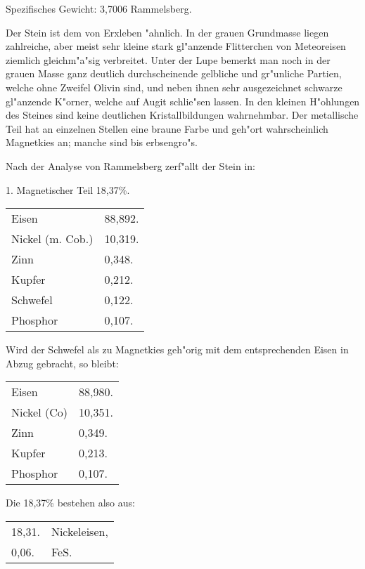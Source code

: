 \documentclass[a4paper, 11pt, oneside]{article}
\begin{document}
Spezifisches Gewicht: 3,7006 Rammelsberg.

Der Stein ist dem von Erxleben "ahnlich. In der grauen Grundmasse liegen zahlreiche, aber meist sehr kleine stark gl"anzende Flitterchen von Meteoreisen ziemlich gleichm"a"sig verbreitet. Unter der Lupe bemerkt man noch in der grauen Masse ganz deutlich durchscheinende gelbliche und gr"unliche Partien, welche ohne Zweifel Olivin sind, und neben ihnen sehr ausgezeichnet schwarze gl"anzende K"orner, welche auf Augit schlie"sen lassen. In den kleinen H"ohlungen des Steines sind keine deutlichen Kristallbildungen wahrnehmbar. Der metallische Teil hat an einzelnen Stellen eine braune Farbe und geh"ort wahrscheinlich Magnetkies an; manche sind bis erbsengro"s.

Nach der Analyse von Rammelsberg zerf"allt der Stein in:
\begin{center}
1. Magnetischer Teil 18,37\%.
\end{center}
\begin{table}[H]
    \centering\swabfamily\Large
    \begin{tabular}{l l}
        \hline
        Eisen & 88,892. \\
        Nickel (m. Cob.)  & 10,319. \\
        Zinn & 0,348. \\
        Kupfer & 0,212. \\
        Schwefel & 0,122. \\
        Phosphor & 0,107. \\
    \end{tabular}
\end{table}

Wird der Schwefel als zu Magnetkies geh"orig mit dem entsprechenden Eisen in Abzug gebracht, so bleibt:
\begin{table}[H]
    \centering\swabfamily\Large
    \begin{tabular}{l l}
        Eisen & 88,980. \\
        Nickel (Co) & 10,351. \\
        Zinn & 0,349. \\
        Kupfer & 0,213. \\
        Phosphor & 0,107. \\
    \end{tabular}
\end{table}

Die 18,37\% bestehen also aus:
\begin{table}[H]
    \centering\swabfamily\Large
    \begin{tabular}{l l}
        18,31. & Nickeleisen, \\
        0,06. & FeS. \\
    \end{tabular}
\end{table}
\end{document}

